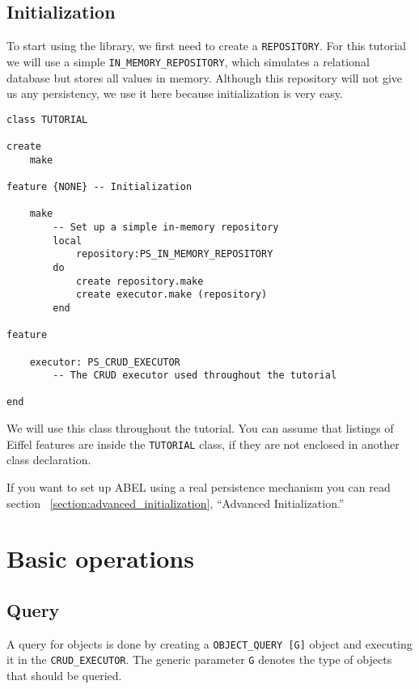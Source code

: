 \subsection{Initialization}

To start using the library, we first need to create a \lstinline!REPOSITORY!.
For this tutorial we will use a simple \lstinline!IN_MEMORY_REPOSITORY!, which simulates a relational database but stores all values in memory.
Although this repository will not give us any persistency, we use it here because initialization is very easy.


\begin{lstlisting}[language=OOSC2Eiffel, captionpos=b, caption={The TUTORIAL class}, label={lst:tutorial_class}]
class TUTORIAL

create
	make

feature {NONE} -- Initialization

	make
		-- Set up a simple in-memory repository
		local
			repository:PS_IN_MEMORY_REPOSITORY
		do
			create repository.make
			create executor.make (repository)
		end

feature
	
	executor: PS_CRUD_EXECUTOR
		-- The CRUD executor used throughout the tutorial

end
\end{lstlisting}

We will use this class throughout the tutorial. You can assume that listings of Eiffel features are inside the \lstinline!TUTORIAL! class, if they are not enclosed in another class declaration.

If you want to set up ABEL using a real persistence mechanism you can read section ~\ref{section:advanced_initialization}, ``Advanced Initialization.''

\section{Basic operations}

\subsection{Query}

A query for objects is done by creating a \lstinline!OBJECT_QUERY [G]! object and executing it in the \lstinline!CRUD_EXECUTOR!.
The generic parameter \lstinline!G! denotes the type of objects that should be queried.

